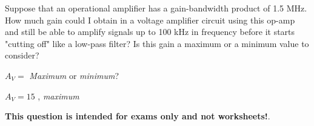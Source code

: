 

Suppose that an operational amplifier has a gain-bandwidth product of 1.5 MHz.  How much gain could I obtain in a voltage amplifier circuit using this op-amp and still be able to amplify signals up to 100 kHz in frequency before it starts "cutting off" like a low-pass filter?  Is this gain a maximum or a minimum value to consider?

\vskip 10pt

$A_V = $ \hskip 150pt {\it Maximum} or {\it minimum}?







$A_V = 15$ , {\it maximum}







{\bf This question is intended for exams only and not worksheets!}.



